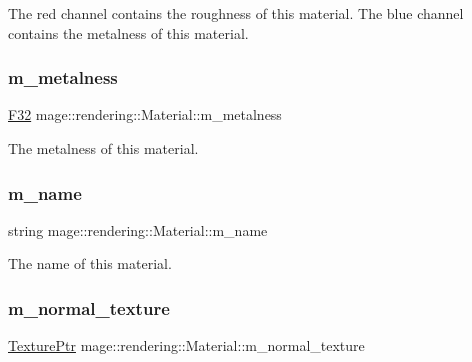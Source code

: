 The red channel contains the roughness of this material. The blue channel contains the metalness of this material. \hypertarget{classmage_1_1rendering_1_1_material_a1ec138a6dfec09ac421517480bd08a75}{}\label{classmage_1_1rendering_1_1_material_a1ec138a6dfec09ac421517480bd08a75} 
\subsubsection{\texorpdfstring{m\+\_\+metalness}{m\_metalness}}
{\footnotesize\ttfamily \hyperlink{namespacemage_aa97e833b45f06d60a0a9c4fc22ae02c0}{F32} mage\+::rendering\+::\+Material\+::m\+\_\+metalness\hspace{0.3cm}{\ttfamily [private]}}

The metalness of this material. \hypertarget{classmage_1_1rendering_1_1_material_a16f309220930c59f17b25fd8b0b62446}{}\label{classmage_1_1rendering_1_1_material_a16f309220930c59f17b25fd8b0b62446} 
\subsubsection{\texorpdfstring{m\+\_\+name}{m\_name}}
{\footnotesize\ttfamily string mage\+::rendering\+::\+Material\+::m\+\_\+name\hspace{0.3cm}{\ttfamily [private]}}

The name of this material. \hypertarget{classmage_1_1rendering_1_1_material_a14911430f38bc998c6d0735dc129f234}{}\label{classmage_1_1rendering_1_1_material_a14911430f38bc998c6d0735dc129f234} 
\subsubsection{\texorpdfstring{m\+\_\+normal\+\_\+texture}{m\_normal\_texture}}
{\footnotesize\ttfamily \hyperlink{namespacemage_1_1rendering_a6f3ae54f825328465b0cdde0f0de4a36}{Texture\+Ptr} mage\+::rendering\+::\+Material\+::m\+\_\+normal\+\_\+texture\hspace{0.3cm}{\ttfamily [private]}}

